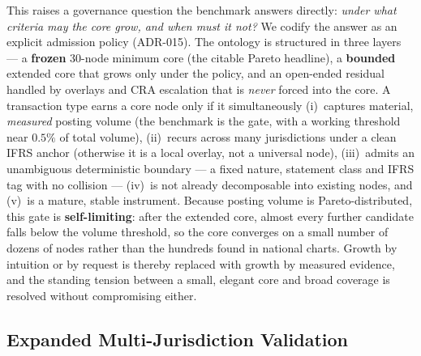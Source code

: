 This raises a governance question the benchmark answers directly: \emph{under
what criteria may the core grow, and when must it not?} We codify the answer as
an explicit admission policy (ADR-015). The ontology is structured in three
layers --- a \textbf{frozen} 30-node minimum core (the citable Pareto headline),
a \textbf{bounded} extended core that grows only under the policy, and an
open-ended residual handled by overlays and CRA escalation that is \emph{never}
forced into the core. A transaction type earns a core node only if it
simultaneously (i)~captures material, \emph{measured} posting volume (the
benchmark is the gate, with a working threshold near $0.5\%$ of total volume),
(ii)~recurs across many jurisdictions under a clean IFRS anchor (otherwise it is
a local overlay, not a universal node), (iii)~admits an unambiguous deterministic
boundary --- a fixed nature, statement class and IFRS tag with no collision ---
(iv)~is not already decomposable into existing nodes, and (v)~is a mature, stable
instrument. Because posting volume is Pareto-distributed, this gate is
\textbf{self-limiting}: after the extended core, almost every further candidate
falls below the volume threshold, so the core converges on a small number of
dozens of nodes rather than the hundreds found in national charts. Growth by
intuition or by request is thereby replaced with growth by measured evidence,
and the standing tension between a small, elegant core and broad coverage is
resolved without compromising either.

\subsection{Expanded Multi-Jurisdiction Validation}
\label{subsec:expanded_validation}

